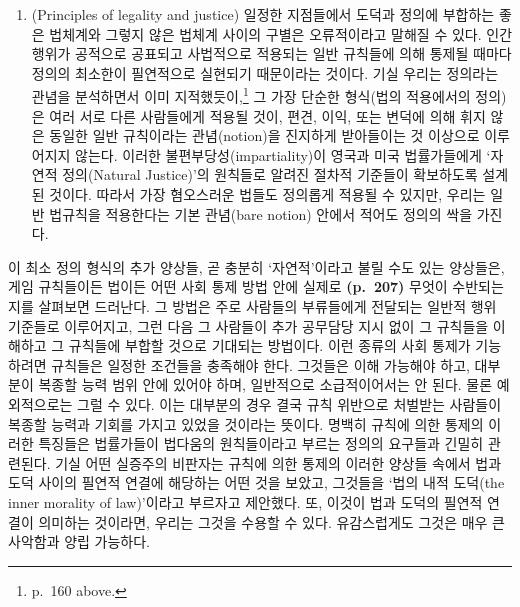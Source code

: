 \begin{enumerate}
\def\labelenumi{(\alph{enumi})}
\setcounter{enumi}{21}
\tightlist
\item
   (Principles of legality and justice)
  일정한 지점들에서 도덕과 정의에 부합하는 좋은 법체계와 그렇지 않은
  법체계 사이의 구별은 오류적이라고 말해질 수 있다. 인간 행위가 공적으로
  공표되고 사법적으로 적용되는 일반 규칙들에 의해 통제될 때마다 정의의
  최소한이 필연적으로 실현되기 때문이라는 것이다. 기실 우리는 정의라는
  관념을 분석하면서 이미 지적했듯이,\footnote{p.~160 above.} 그 가장
  단순한 형식(법의 적용에서의 정의)은 여러 서로 다른 사람들에게 적용될
  것이, 편견, 이익, 또는 변덕에 의해 휘지 않은 동일한 일반 규칙이라는
  관념(notion)을 진지하게 받아들이는 것 이상으로 이루어지지 않는다.
  이러한 불편부당성(impartiality)이 영국과 미국 법률가들에게 ‘자연적
  정의(Natural Justice)’의 원칙들로 알려진 절차적 기준들이 확보하도록
  설계된 것이다. 따라서 가장 혐오스러운 법들도 정의롭게 적용될 수
  있지만, 우리는 일반 법규칙을 적용한다는 기본 관념(bare notion) 안에서
  적어도 정의의 싹을 가진다.
\end{enumerate}

이 최소 정의 형식의 추가 양상들, 곧 충분히 ‘자연적’이라고 불릴 수도 있는
양상들은, 게임 규칙들이든 법이든 어떤 사회 통제 방법 안에 실제로
\textbf{(p.~207)} 무엇이 수반되는지를 살펴보면 드러난다. 그 방법은 주로
사람들의 부류들에게 전달되는 일반적 행위 기준들로 이루어지고, 그런 다음
그 사람들이 추가 공무담당 지시 없이 그 규칙들을 이해하고 그 규칙들에
부합할 것으로 기대되는 방법이다. 이런 종류의 사회 통제가 기능하려면
규칙들은 일정한 조건들을 충족해야 한다. 그것들은 이해 가능해야 하고,
대부분이 복종할 능력 범위 안에 있어야 하며, 일반적으로 소급적이어서는 안
된다. 물론 예외적으로는 그럴 수 있다. 이는 대부분의 경우 결국 규칙
위반으로 처벌받는 사람들이 복종할 능력과 기회를 가지고 있었을 것이라는
뜻이다. 명백히 규칙에 의한 통제의 이러한 특징들은 법률가들이 법다움의
원칙들이라고 부르는 정의의 요구들과 긴밀히 관련된다. 기실 어떤 실증주의
비판자는 규칙에 의한 통제의 이러한 양상들 속에서 법과 도덕 사이의 필연적
연결에 해당하는 어떤 것을 보았고, 그것들을 ‘법의 내적 도덕(the inner
morality of law)’이라고 부르자고 제안했다. 또, 이것이 법과 도덕의 필연적
연결이 의미하는 것이라면, 우리는 그것을 수용할 수 있다. 유감스럽게도
그것은 매우 큰 사악함과 양립 가능하다.

